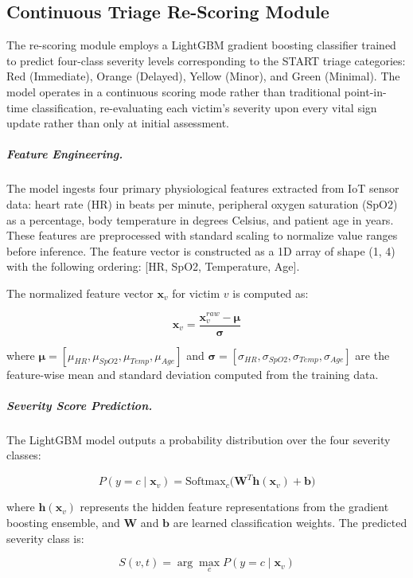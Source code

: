 \documentclass[conference]{IEEEtran}
\begin{document}
\subsection{Continuous Triage Re-Scoring Module}

The re-scoring module employs a LightGBM gradient boosting classifier trained to predict four-class severity levels corresponding to the START triage categories: Red (Immediate), Orange (Delayed), Yellow (Minor), and Green (Minimal). The model operates in a continuous scoring mode rather than traditional point-in-time classification, re-evaluating each victim's severity upon every vital sign update rather than only at initial assessment.

\subparagraph{Feature Engineering.}
The model ingests four primary physiological features extracted from IoT sensor data: heart rate (HR) in beats per minute, peripheral oxygen saturation (SpO2) as a percentage, body temperature in degrees Celsius, and patient age in years. These features are preprocessed with standard scaling to normalize value ranges before inference. The feature vector is constructed as a 1D array of shape (1, 4) with the following ordering: [HR, SpO2, Temperature, Age].

The normalized feature vector $\mathbf{x}_v$ for victim $v$ is computed as:

\begin{equation}
\mathbf{x}_v = \frac{\mathbf{x}_v^{raw} - \boldsymbol{\mu}}{\boldsymbol{\sigma}}
\end{equation}

where $\boldsymbol{\mu} = [\mu_{HR}, \mu_{SpO2}, \mu_{Temp}, \mu_{Age}]$ and $\boldsymbol{\sigma} = [\sigma_{HR}, \sigma_{SpO2}, \sigma_{Temp}, \sigma_{Age}]$ are the feature-wise mean and standard deviation computed from the training data.

\subparagraph{Severity Score Prediction.}
The LightGBM model outputs a probability distribution over the four severity classes:

\begin{equation}
P(y = c \mid \mathbf{x}_v) = \mathrm{Softmax}_c\bigl(\mathbf{W}^T \mathbf{h}(\mathbf{x}_v) + \mathbf{b}\bigr)
\end{equation}

where $\mathbf{h}(\mathbf{x}_v)$ represents the hidden feature representations from the gradient boosting ensemble, and $\mathbf{W}$ and $\mathbf{b}$ are learned classification weights. The predicted severity class is:

\begin{equation}
S(v,t) = \arg\max_c P(y = c \mid \mathbf{x}_v)
\end{equation}
\end{document}
